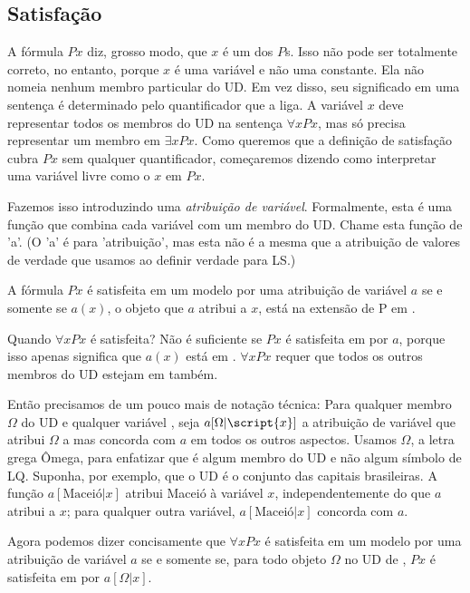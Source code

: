 \subsection{Satisfação}

A fórmula $Px$ diz, grosso modo, que $x$ é um dos $P$s. Isso não pode ser totalmente correto, no entanto, porque $x$ é uma variável e não uma constante. Ela não nomeia nenhum membro particular do UD. Em vez disso, seu significado em uma sentença é determinado pelo quantificador que a liga. A variável $x$ deve representar todos os membros do UD na sentença $\forall xPx$, mas só precisa representar um membro em $\exists xPx$. Como queremos que a definição de satisfação cubra $Px$ sem qualquer quantificador, começaremos dizendo como interpretar uma variável livre como o $x$ em $Px$.

Fazemos isso introduzindo uma \emph{atribuição de variável}. Formalmente, esta é uma função que combina cada variável com um membro do UD. Chame esta função de 'a'. (O 'a' é para 'atribuição', mas esta não é a mesma que a atribuição de valores de verdade que usamos ao definir verdade para LS.)

A fórmula $Px$ é satisfeita em um modelo  por uma atribuição de variável $a$ se e somente se $a(x)$, o objeto que $a$ atribui a $x$, está na extensão de P em .

Quando $\forall x Px$ é satisfeita? Não é suficiente se $Px$ é satisfeita em  por $a$, porque isso apenas significa que $a(x)$ está em . $\forall x Px$ requer que todos os outros membros do UD estejam em  também.

Então precisamos de um pouco mais de notação técnica: Para qualquer membro $\Omega$ do UD e qualquer variável , seja $a[\Omega|\script{x}]$ a atribuição de variável que atribui $\Omega$ a  mas concorda com $a$ em todos os outros aspectos. Usamos $\Omega$, a letra grega Ômega, para enfatizar que é algum membro do UD e não algum símbolo de LQ. Suponha, por exemplo, que o UD é o conjunto das capitais brasileiras. A função $a[\mbox{Maceió}|x]$ atribui Maceió à variável $x$, independentemente do que $a$ atribui a $x$; para qualquer outra variável, $a[\mbox{Maceió}|x]$ concorda com $a$.

Agora podemos dizer concisamente que $\forall x Px$ é satisfeita em um modelo  por uma atribuição de variável $a$ se e somente se, para todo objeto $\Omega$ no UD de , $Px$ é satisfeita em  por $a[\Omega|x]$.

